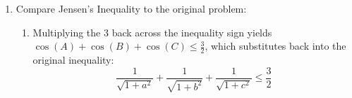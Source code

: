 \documentclass[12pt]{article}
\begin{document}
\begin{enumerate}
    \item Compare Jensen's Inequality to the original problem:
    \begin{enumerate}
        \item Multiplying the $3$ back across the inequality sign yields $\cos(A) + \cos(B) + \cos(C) \le \frac{3}{2}$, which substitutes back into the original inequality:
        \[
            \frac{1}{\sqrt{1+a^2}} + \frac{1}{\sqrt{1+b^2}} + \frac{1}{\sqrt{1+c^2}} \le \frac{3}{2}
        \]
    \end{enumerate}
\end{enumerate}
\end{document}
